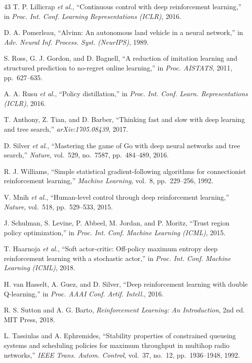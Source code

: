 \documentclass[journal]{IEEEtran}
\begin{document}
\begin{thebibliography}{43}
T. P. Lillicrap \emph{et al.}, ``Continuous control with deep reinforcement learning,'' in \emph{Proc. Int. Conf. Learning Representations (ICLR)}, 2016.

D. A. Pomerleau, ``Alvinn: An autonomous land vehicle in a neural network,'' in \emph{Adv. Neural Inf. Process. Syst. (NeurIPS)}, 1989.

S. Ross, G. J. Gordon, and D. Bagnell, ``A reduction of imitation learning and structured prediction to no-regret online learning,'' in \emph{Proc. AISTATS}, 2011, pp.~627--635.

A. A. Rusu \emph{et al.}, ``Policy distillation,'' in \emph{Proc. Int. Conf. Learn. Representations (ICLR)}, 2016.

T. Anthony, Z. Tian, and D. Barber, ``Thinking fast and slow with deep learning and tree search,'' \emph{arXiv:1705.08439}, 2017.

D. Silver \emph{et al.}, ``Mastering the game of Go with deep neural networks and tree search,'' \emph{Nature}, vol.~529, no.~7587, pp.~484--489, 2016.

R. J. Williams, ``Simple statistical gradient-following algorithms for connectionist reinforcement learning,'' \emph{Machine Learning}, vol.~8, pp.~229--256, 1992.

V. Mnih \emph{et al.}, ``Human-level control through deep reinforcement learning,'' \emph{Nature}, vol.~518, pp.~529--533, 2015.

J. Schulman, S. Levine, P. Abbeel, M. Jordan, and P. Moritz, ``Trust region policy optimization,'' in \emph{Proc. Int. Conf. Machine Learning (ICML)}, 2015.

T. Haarnoja \emph{et al.}, ``Soft actor-critic: Off-policy maximum entropy deep reinforcement learning with a stochastic actor,'' in \emph{Proc. Int. Conf. Machine Learning (ICML)}, 2018.

H. van Hasselt, A. Guez, and D. Silver, ``Deep reinforcement learning with double Q-learning,'' in \emph{Proc. AAAI Conf. Artif. Intell.}, 2016.

R. S. Sutton and A. G. Barto, \emph{Reinforcement Learning: An Introduction}, 2nd ed. MIT Press, 2018.

L. Tassiulas and A. Ephremides, ``Stability properties of constrained queueing systems and scheduling policies for maximum throughput in multihop radio networks,'' \emph{IEEE Trans. Autom. Control}, vol.~37, no.~12, pp.~1936--1948, 1992.


\end{thebibliography}
\end{document}
